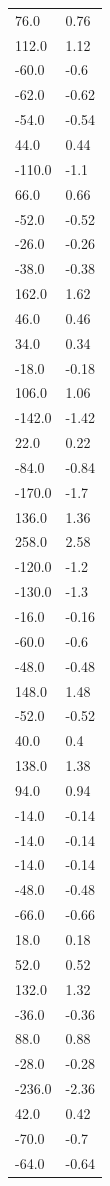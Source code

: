 \begin{longtable}{ll}
76.0 & 0.76 \\
112.0 & 1.12 \\
-60.0 & -0.6 \\
-62.0 & -0.62 \\
-54.0 & -0.54 \\
44.0 & 0.44 \\
-110.0 & -1.1 \\
66.0 & 0.66 \\
-52.0 & -0.52 \\
-26.0 & -0.26 \\
-38.0 & -0.38 \\
162.0 & 1.62 \\
46.0 & 0.46 \\
34.0 & 0.34 \\
-18.0 & -0.18 \\
106.0 & 1.06 \\
-142.0 & -1.42 \\
22.0 & 0.22 \\
-84.0 & -0.84 \\
-170.0 & -1.7 \\
136.0 & 1.36 \\
258.0 & 2.58 \\
-120.0 & -1.2 \\
-130.0 & -1.3 \\
-16.0 & -0.16 \\
-60.0 & -0.6 \\
-48.0 & -0.48 \\
148.0 & 1.48 \\
-52.0 & -0.52 \\
40.0 & 0.4 \\
138.0 & 1.38 \\
94.0 & 0.94 \\
-14.0 & -0.14 \\
-14.0 & -0.14 \\
-14.0 & -0.14 \\
-48.0 & -0.48 \\
-66.0 & -0.66 \\
18.0 & 0.18 \\
52.0 & 0.52 \\
132.0 & 1.32 \\
-36.0 & -0.36 \\
88.0 & 0.88 \\
-28.0 & -0.28 \\
-236.0 & -2.36 \\
42.0 & 0.42 \\
-70.0 & -0.7 \\
-64.0 & -0.64 \\

\end{longtable}
